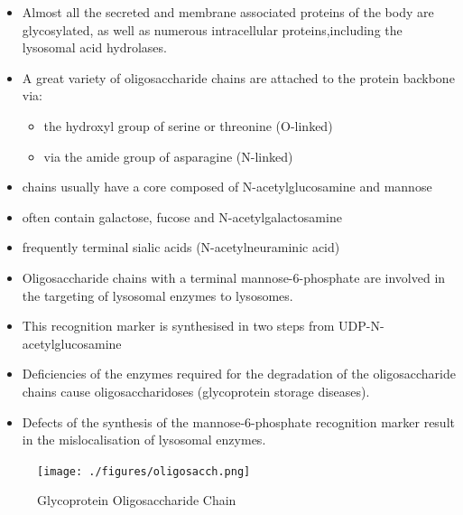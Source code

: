 \documentclass{scrartcl}
\begin{document}
\begin{itemize}
\item Almost all the secreted and membrane associated proteins of the body
are glycosylated, as well as numerous intracellular
proteins,including the lysosomal acid hydrolases.
\item A great variety of oligosaccharide chains are attached to the
protein backbone via:
\begin{itemize}
\item the hydroxyl group of serine or threonine (O-linked)
\item via the amide group of asparagine (N-linked)
\end{itemize}

\item chains usually have a core composed of N-acetylglucosamine and mannose
\item often contain galactose, fucose and N-acetylgalactosamine
\item frequently terminal sialic acids (N-acetylneuraminic acid)
\item Oligosaccharide chains with a terminal mannose-6-phosphate are
involved in the targeting of lysosomal enzymes to lysosomes.
\item This recognition marker is synthesised in two steps from UDP-N-acetylglucosamine

\item Deficiencies of the enzymes required for the degradation of the
oligosaccharide chains cause oligosaccharidoses (glycoprotein storage diseases).

\item Defects of the synthesis of the mannose-6-phosphate recognition
marker result in the mislocalisation of lysosomal enzymes.
\end{itemize}


\begin{figure}[htbp]
\centering
\texttt{[image: ./figures/oligosacch.png]}
\caption{\label{fig:org91ab851}
Glycoprotein Oligosaccharide Chain}
\end{figure}
\end{document}
